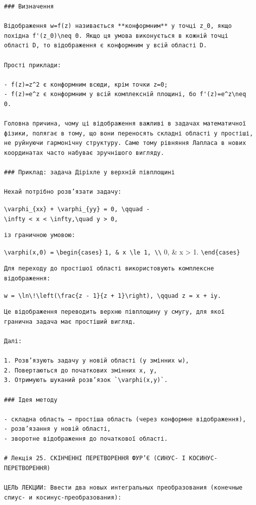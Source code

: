 \documentclass[
  ukrainian,
]{article}
\begin{document}
\begin{verbatim}
### Визначення

Відображення w=f(z) називається **конформним** у точці z_0, якщо похідна f'(z_0)\neq 0. Якщо ця умова виконується в кожній точці області D, то відображення є конформним у всій області D.

Прості приклади:

- f(z)=z^2 є конформним всюди, крім точки z=0;
- f(z)=e^z є конформним у всій комплексній площині, бо f'(z)=e^z\neq 0.

Головна причина, чому ці відображення важливі в задачах математичної фізики, полягає в тому, що вони переносять складні області у простіші, не руйнуючи гармонічну структуру. Саме тому рівняння Лапласа в нових координатах часто набуває зручнішого вигляду.

### Приклад: задача Діріхле у верхній півплощині

Нехай потрібно розв’язати задачу:
\end{verbatim}

\texttt{\textbackslash{}varphi\_\{xx\}\ +\ \textbackslash{}varphi\_\{yy\}\ =\ 0,\ \textbackslash{}qquad\ -\textbackslash{}infty\ \textless{}\ x\ \textless{}\ \textbackslash{}infty,\textbackslash{}quad\ y\ \textgreater{}\ 0,}

\begin{verbatim}
із граничною умовою:
\end{verbatim}

\texttt{\textbackslash{}varphi(x,0)\ =}
\texttt{\textbackslash{}begin\{cases\}}
\texttt{1,\ \&\ \textbar{}x\textbar{}\ \textbackslash{}le\ 1,\ \textbackslash{}\textbackslash{}}
0, \& \textbar x\textbar{} \textgreater{} 1.
\texttt{\textbackslash{}end\{cases\}}

\begin{verbatim}
Для переходу до простішої області використовують комплексне відображення:
\end{verbatim}

\texttt{w\ =\ \textbackslash{}ln\textbackslash{}!\textbackslash{}left(\textbackslash{}frac\{z\ -\ 1\}\{z\ +\ 1\}\textbackslash{}right),\ \textbackslash{}qquad\ z\ =\ x\ +\ iy.}

\begin{verbatim}
Це відображення переводить верхню півплощину у смугу, для якої гранична задача має простіший вигляд.

Далі:

1. Розв’язують задачу у новій області (у змінних w),
2. Повертаються до початкових змінних x, y,
3. Отримують шуканий розв’язок `\varphi(x,y)`.

### Ідея методу

- складна область → простіша область (через конформне відображення),
- розв’язання у новій області,
- зворотне відображення до початкової області.

# Лекція 25. СКІНЧЕННІ ПЕРЕТВОРЕННЯ ФУР’Є (СИНУС- І КОСИНУС-ПЕРЕТВОРЕННЯ)

ЦЕЛЬ ЛЕКЦИИ: Ввести два новых интегральных преобразования (конечные спиус- и косинус-преобразования):
\end{verbatim}
\end{document}
